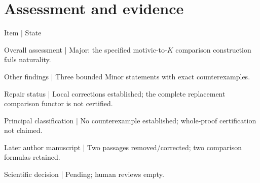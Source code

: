 \documentclass[10pt]{article}
\begin{document}
\section*{Assessment and evidence}
Item | State\par
Overall assessment | Major: the specified motivic-to-\(K\) comparison construction fails naturality.\par
Other findings | Three bounded Minor statements with exact counterexamples.\par
Repair status | Local corrections established; the complete replacement comparison functor is not certified.\par
Principal classification | No counterexample established; whole-proof certification not claimed.\par
Later author manuscript | Two passages removed/corrected; two comparison formulas retained.\par
Scientific decision | Pending; human reviews empty.\par
\end{document}
